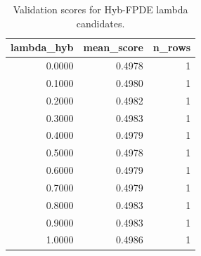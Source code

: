 \begin{table}[t]
\caption{Validation scores for Hyb-FPDE lambda candidates.}
\label{tab:lambda_distribution_computed}
\centering
\begin{tabular}{rrr}
\toprule
lambda\_hyb & mean\_score & n\_rows \\
\midrule
0.0000 & 0.4978 & 1 \\
0.1000 & 0.4980 & 1 \\
0.2000 & 0.4982 & 1 \\
0.3000 & 0.4983 & 1 \\
0.4000 & 0.4979 & 1 \\
0.5000 & 0.4978 & 1 \\
0.6000 & 0.4979 & 1 \\
0.7000 & 0.4979 & 1 \\
0.8000 & 0.4983 & 1 \\
0.9000 & 0.4983 & 1 \\
1.0000 & 0.4986 & 1 \\
\bottomrule
\end{tabular}

\end{table}
